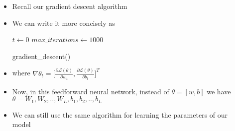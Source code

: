 \begin{frame}
  \begin{columns}
    \begin{overlayarea}{\textwidth}{\textheight}
      \makebox[\textwidth][c]{\usebox{\nncontent}}
    \end{overlayarea}

    \begin{overlayarea}{\textwidth}{\textheight}
      \begin{itemize}
        \item Recall our gradient descent algorithm
        \item {} {We can write it more concisely as}
             {
              \begin{algorithm}[H]
                \SetAlgoLined
                $t \leftarrow 0$\;
                $max\_iterations\leftarrow 1000$\;
                \caption{gradient\_descent()}
              \end{algorithm}
            }
        \item<5-> where $\nabla \theta_{t} = \big[\frac{\partial \mathscr{L}(\theta)}{\partial w_t}, \frac{\partial \mathscr{L}(\theta)}{\partial b_t}\big]^{T}$
        \item<6-> Now, in this feedforward neural network, instead of $\theta = [w, b]$ we have $\theta = {W_{1}, W_2, .., W_{L}, b_1, b_2, .., b_{L}}$
        \item<7-> We can still use the same algorithm for learning the parameters of our model

      \end{itemize}
    \end{overlayarea}

  \end{columns}
\end{frame}

